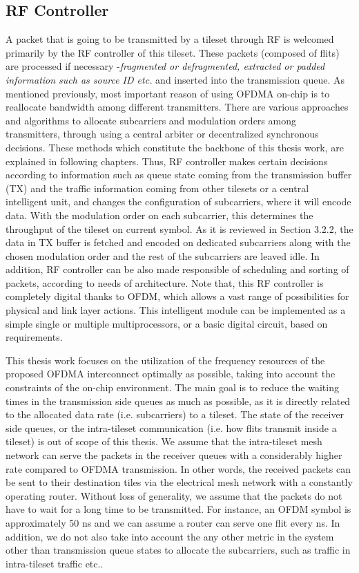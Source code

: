 \subsection{RF Controller}
A packet that is going to be transmitted by a tileset through RF is welcomed primarily by the RF controller of this tileset. These packets (composed of flits) are processed if necessary -\textit{fragmented or defragmented, extracted or padded information such as source ID etc.} and inserted into the transmission queue. As mentioned previously, most important reason of using OFDMA on-chip is to reallocate bandwidth among different transmitters. There are various approaches and algorithms to allocate subcarriers and modulation orders among transmitters, through using a central arbiter or decentralized synchronous decisions. These methods which constitute the backbone of this thesis work, are explained in following chapters. Thus, RF controller makes certain decisions according to information such as queue state coming from the transmission buffer (TX) and the traffic information coming from other tilesets or a central intelligent unit, and changes the configuration of subcarriers, where it will encode data. With the modulation order on each subcarrier, this determines the throughput of the tileset on current symbol. As it is reviewed in Section 3.2.2, the data in TX buffer is fetched and encoded on dedicated subcarriers along with the chosen modulation order and the rest of the subcarriers are leaved idle. In addition, RF controller can be also made responsible of scheduling and sorting of packets, according to needs of architecture. Note that, this RF controller is completely digital thanks to OFDM, which allows a vast range of possibilities for physical and link layer actions. This intelligent module can be implemented as a simple single or multiple multiprocessors, or a basic digital circuit, based on requirements. 

This thesis work focuses on the utilization of the frequency resources of the proposed OFDMA interconnect optimally as possible, taking into account the constraints of the on-chip environment. The main goal is to reduce the waiting times in the transmission side queues as much as possible, as it is directly related to the allocated data rate (i.e. subcarriers) to a tileset. The state of the receiver side queues, or the intra-tileset communication (i.e. how flits transmit inside a tileset) is out of scope of this thesis. We assume that the intra-tileset mesh network can serve the packets in the receiver queues with a considerably higher rate compared to OFDMA transmission. In other words, the received packets can be sent to their destination tiles via the electrical mesh network with a constantly operating router. Without loss of generality, we assume that the packets do not have to wait for a long time to be transmitted. For instance, an OFDM symbol is approximately 50 ns and we can assume a router can serve one flit every ns. In addition, we do not also take into account the any other metric in the system other than transmission queue states to allocate the subcarriers, such as traffic in intra-tileset traffic etc..


